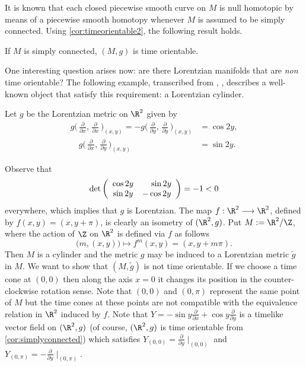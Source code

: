 It is known that each closed piecewise smooth curve on $M$ is null homotopic by means of a piecewise smooth homotopy whenever $M$ is assumed to be simply connected. Using \autoref{cor:timeorientable2}, the following result holds.

\begin{corollary}
	\label{cor:simplyconnected}
	If $M$ is simply connected, $(M,g)$ is time orientable.
\end{corollary}

One interesting question arises now: are there Lorentzian manifolds that are \emph{non} time orientable? The following example, transcribed from \cite[Example 3.5]{romero10}, \cite[Example 1.2.3]{sachs77}, describes a well-known object that satisfy this requirement: a Lorentzian cylinder.

\begin{example}
	Let $g$ be the Lorentzian metric on $\R^2$ given by
	\begin{align*}
		g\Big(\,\frac{\partial}{\partial x},\,\frac{\partial}{\partial x}\,\Big)_{(x,y)}=-g\Big(\,\frac{\partial}{\partial y},\,\frac{\partial}{\partial y}\,\Big)_{(x,y)} &= \cos 2y,\\
		\quad g\Big(\,\frac{\partial}{\partial x},\,\frac{\partial}{\partial y}\,\Big)_{(x,y)}&= \sin 2y.
	\end{align*}
	
	Observe that
	\[
		\mathrm{det}\left(
			\begin{array}{cc}
			\cos 2y & \hspace*{4mm}\sin 2y  \\
			\sin 2y & -\cos 2y
		\end{array} \right) = -1 < 0
	\]
	everywhere, which implies that $g$ is Lorentzian. The map $f : \R^2 \longrightarrow \R^2$, defined by $f(x,y)=(x,y+\pi)$, is clearly an isometry of $(\R^2,g)$. Put $M:=\R^2 / \Z$, where the action of $\Z$ on $\R^2$ is defined via $f$ as follows
	\[
		\big(m,(x,y)\big) \mapsto f^m(x,y)=(x,y+m\pi).
	\]
	Then $M$ is a cylinder and the metric $g$ may be induced to a Lorentzian metric ${\tilde g}$ in $M$. We want to show that $(M,{\tilde g})$ is not time orientable. If we choose a time cone at $(0,0)$ then along the axis $x=0$ it changes its position in the counter-clockwise rotation sense. Note that $(0,0)$ and $(0,\pi)$ represent the same point of $M$ but the time cones at these points are not compatible with the equivalence relation in $\R^2$ induced by $f$. Note that $Y=-\sin y \frac{\partial}{\partial x} + \cos y \frac{\partial}{\partial y}$ is a timelike vector field on $(\R^2,g)$ (of course, $(\R^2,g)$ is time orientable from \autoref{cor:simplyconnected}) which satisfies $Y_{(0,0)}=\frac{\partial}{\partial y}\mid_{(0,0)}$ and $Y_{(0,\pi)}=-\frac{\partial}{\partial y}\mid_{(0,\pi)}$.
	

\end{example}
